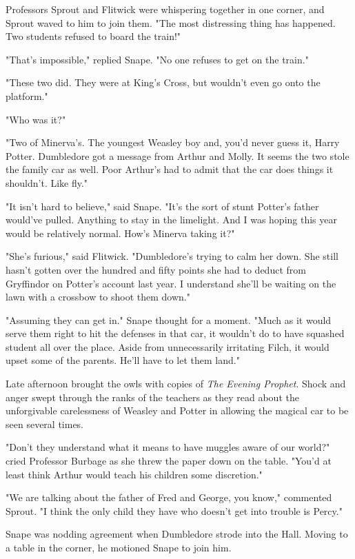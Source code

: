 \documentclass[a4paper,11pt]{article}
\begin{document}
Professors Sprout and Flitwick were whispering together in one corner, and Sprout waved to him to join them. "The most distressing thing has happened. Two students refused to board the train!"

"That's impossible," replied Snape. "No one refuses to get on the train."

"These two did. They were at King's Cross, but wouldn't even go onto the platform."

"Who was it?"

"Two of Minerva's. The youngest Weasley boy and, you'd never guess it, Harry Potter. Dumbledore got a message from Arthur and Molly. It seems the two stole the family car as well. Poor Arthur's had to admit that the car does things it shouldn't. Like fly."

"It isn't hard to believe," said Snape. "It's the sort of stunt Potter's father would've pulled. Anything to stay in the limelight. And I was hoping this year would be relatively normal. How's Minerva taking it?"

"She's furious," said Flitwick. "Dumbledore's trying to calm her down. She still hasn't gotten over the hundred and fifty points she had to deduct from Gryffindor on Potter's account last year. I understand she'll be waiting on the lawn with a crossbow to shoot them down."

"Assuming they can get in." Snape thought for a moment. "Much as it would serve them right to hit the defenses in that car, it wouldn't do to have squashed student all over the place. Aside from unnecessarily irritating Filch, it would upset some of the parents. He'll have to let them land."

Late afternoon brought the owls with copies of \emph{The Evening Prophet}. Shock and anger swept through the ranks of the teachers as they read about the unforgivable carelessness of Weasley and Potter in allowing the magical car to be seen several times.

"Don't they understand what it means to have muggles aware of our world?" cried Professor Burbage as she threw the paper down on the table. "You'd at least think Arthur would teach his children some discretion."

"We are talking about the father of Fred and George, you know," commented Sprout. "I think the only child they have who doesn't get into trouble is Percy."

Snape was nodding agreement when Dumbledore strode into the Hall. Moving to a table in the corner, he motioned Snape to join him.
\end{document}
